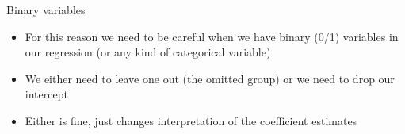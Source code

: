 \documentclass[aspectratio=169]{beamer}
\begin{document}
\begin{frame}{Binary variables}
    \begin{itemize}
        \item For this reason we need to be careful when we have binary (0/1) variables in our regression (or any kind of categorical variable)
        \item We either need to leave one out (the omitted group) or we need to drop our intercept
        \item Either is fine, just changes interpretation of the coefficient estimates
    \end{itemize}
\end{frame}

\end{document}
